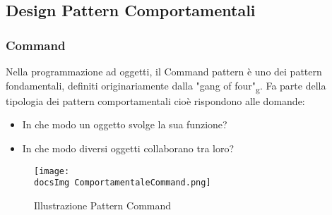 {	\subsection{Design Pattern Comportamentali}{
		\subsubsection{Command}{
			Nella programmazione ad oggetti, il Command pattern è uno dei pattern fondamentali, definiti originariamente dalla "gang of four"\textsubscript{g}. Fa parte della tipologia dei pattern comportamentali cioè rispondono alle domande: 
			\begin{itemize}
				\item In che modo un oggetto svolge la sua funzione?
				\item In che modo diversi oggetti collaborano tra loro?
			\end{itemize}
		
			\begin{figure}[ht]
				\centering
				\texttt{[image: \\docsImg ComportamentaleCommand.png]}
				\caption{Illustrazione Pattern Command}
				\label{Illustrazione Pattern Command}
			\end{figure}
		
}}}
